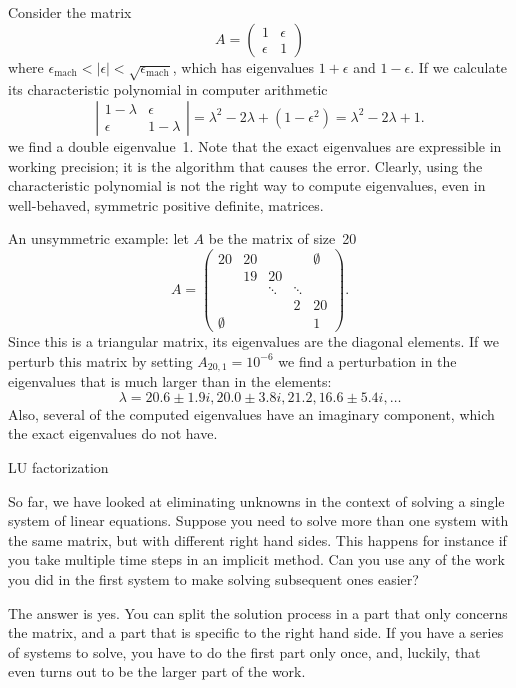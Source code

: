Consider the matrix 
\[ A=
\begin{pmatrix}
1&\epsilon\\ \epsilon&1  
\end{pmatrix}
\]
where $\epsilon_{\mathrm{mach}}<|\epsilon|<\sqrt{\epsilon_{\mathrm{mach}}}$,
which has eigenvalues $1+\epsilon$ and $1-\epsilon$.
If we calculate its characteristic polynomial in computer arithmetic
\[ \left|
  \begin{matrix}
    1-\lambda&\epsilon\\ \epsilon&1-\lambda
  \end{matrix}\right| = \lambda^2-2\lambda+(1-\epsilon^2)=
  \lambda^2-2\lambda+1.
\]
we find a
double eigenvalue~1. Note that the exact eigenvalues are
expressible in working precision; it is the algorithm that causes
the error. Clearly, using the characteristic polynomial is not the
right way to compute eigenvalues, even in well-behaved, symmetric
positive definite, matrices.

An unsymmetric example: let $A$ be the matrix of size~20
\[ A=
\begin{pmatrix}
  20&20&      &      &\emptyset\\
    &19&20\\
    &  &\ddots&\ddots\\
    &  &      &2     &20\\
  \emptyset&  &      &      &1
\end{pmatrix}.
\]
Since this is a triangular matrix, its eigenvalues are the diagonal
elements. If we perturb this matrix by setting $A_{20,1}=10^{-6}$ we
find a perturbation in the eigenvalues that is much larger than in the
elements:
\[ \lambda=20.6\pm 1.9i, 20.0\pm 3.8i, 21.2,16.6\pm 5.4i,\ldots \]
Also, several of the computed eigenvalues have an imaginary component,
which the exact eigenvalues do not have.

 {LU factorization}
\label{sec:lu-fact}

So far, we have looked at eliminating unknowns in the context of
solving a single system of linear equations.  Suppose you need to
solve more than one system with the same matrix, but with different
right hand sides. This happens for instance if you take multiple time
steps in an implicit method. Can you use any of the work you did in
the first system to make solving subsequent ones easier?

The answer is yes. You can split the solution process in a part that
only concerns the matrix, and a part that is specific to the right hand
side. If you have a series of systems to solve, you have to do the
first part only once, and, luckily, that even turns out to be the
larger part of the work.

